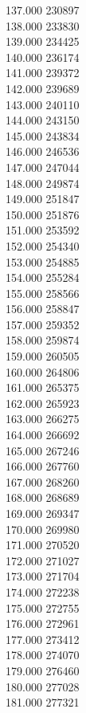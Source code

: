 { 137.000	230897 \\
 138.000	233830 \\
 139.000	234425 \\
 140.000	236174 \\
 141.000	239372 \\
 142.000	239689 \\
 143.000	240110 \\
 144.000	243150 \\
 145.000	243834 \\
 146.000	246536 \\
 147.000	247044 \\
 148.000	249874 \\
 149.000	251847 \\
 150.000	251876 \\
 151.000	253592 \\
 152.000	254340 \\
 153.000	254885 \\
 154.000	255284 \\
 155.000	258566 \\
 156.000	258847 \\
 157.000	259352 \\
 158.000	259874 \\
 159.000	260505 \\
 160.000	264806 \\
 161.000	265375 \\
 162.000	265923 \\
 163.000	266275 \\
 164.000	266692 \\
 165.000	267246 \\
 166.000	267760 \\
 167.000	268260 \\
 168.000	268689 \\
 169.000	269347 \\
 170.000	269980 \\
 171.000	270520 \\
 172.000	271027 \\
 173.000	271704 \\
 174.000	272238 \\
 175.000	272755 \\
 176.000	272961 \\
 177.000	273412 \\
 178.000	274070 \\
 179.000	276460 \\
 180.000	277028 \\
 181.000	277321 \\
}
